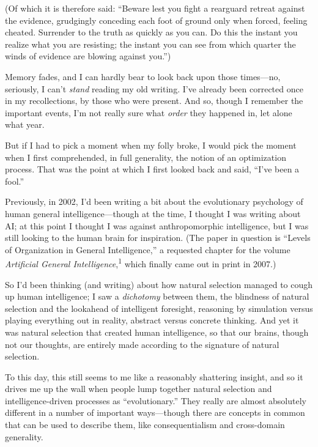{
 (Of which it is therefore said: ``Beware lest you
fight a rearguard retreat against the evidence, grudgingly conceding
each foot of ground only when forced, feeling cheated. Surrender to the
truth as quickly as you can. Do this the instant you realize what you
are resisting; the instant you can see from which quarter the winds of
evidence are blowing against you.'')}

{
 Memory fades, and I can hardly bear to look back upon those
times---no, seriously, I can't \textit{stand} reading
my old writing. I've already been corrected once in my
recollections, by those who were present. And so, though I remember the
important events, I'm not really sure what
\textit{order} they happened in, let alone what year.}

{
 But if I had to pick a moment when my folly broke, I would pick
the moment when I first comprehended, in full generality, the notion of
an optimization process. That was the point at which I first looked
back and said, ``I've been a
fool.''}

{
 Previously, in 2002, I'd been writing a bit about
the evolutionary psychology of human general intelligence---though at
the time, I thought I was writing about AI; at this point I thought I
was against anthropomorphic intelligence, but I was still looking to
the human brain for inspiration. (The paper in question is
``Levels of Organization in General
Intelligence,'' a requested chapter for the volume
\textit{Artificial General Intelligence},\textsuperscript{1} which
finally came out in print in 2007.)}

{
 So I'd been thinking (and writing) about how
natural selection managed to cough up human intelligence; I saw a
\textit{dichotomy} between them, the blindness of natural selection and
the lookahead of intelligent foresight, reasoning by simulation versus
playing everything out in reality, abstract versus concrete thinking.
And yet it was natural selection that created human intelligence, so
that our brains, though not our thoughts, are entirely made according
to the signature of natural selection.}

{
 To this day, this still seems to me like a reasonably shattering
insight, and so it drives me up the wall when people lump together
natural selection and intelligence-driven processes as
``evolutionary.'' They really are
almost absolutely different in a number of important ways---though
there are concepts in common that can be used to describe them, like
consequentialism and cross-domain generality.}

